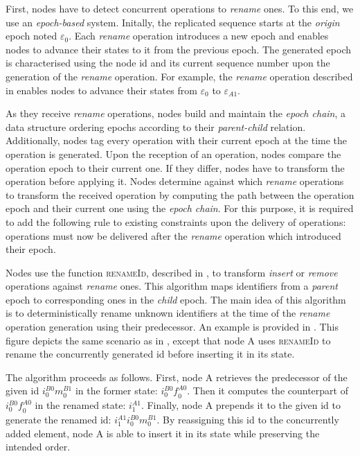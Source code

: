 \documentclass[10pt,journal,compsoc]{IEEEtran}
\newcommand{\trm}[1]{\mathit{#1}}
\newcommand{\id}[3]{$\trm{#1}^{\trm{#2}}_{\trm{#3}}$}
\newcommand{\epoch}[1]{$\varepsilon_{#1}$}
\begin{document}
First, nodes have to detect concurrent operations to \emph{rename} ones.
To this end, we use an \emph{epoch-based} system.
Initally, the replicated sequence starts at the \emph{origin} epoch noted \epoch{0}.
Each \emph{rename} operation introduces a new epoch and enables nodes to advance their states to it from the previous epoch.
The generated epoch is characterised using the node id and its current sequence number upon the generation of the \emph{rename} operation.
For example, the \emph{rename} operation described in  enables nodes to advance their states from \epoch{0} to \epoch{A1}.

As they receive \emph{rename} operations, nodes build and maintain the \emph{epoch chain}, a data structure ordering epochs according to their \emph{parent-child} relation.
Additionally, nodes tag every operation with their current epoch at the time the operation is generated.
Upon the reception of an operation, nodes compare the operation epoch to their current one.
If they differ, nodes have to transform the operation before applying it.
Nodes determine against which \emph{rename} operations to transform the received operation by computing the path between the operation epoch and their current one using the \emph{epoch chain}.
For this purpose, it is required to add the following rule to existing constraints upon the delivery of operations: operations must now be delivered after the \emph{rename} operation which introduced their epoch.

Nodes use the function \textsc{renameId}, described in , to transform \emph{insert} or \emph{remove} operations against \emph{rename} ones.
This algorithm maps identifiers from a \emph{parent} epoch to corresponding ones in the \emph{child} epoch.
The main idea of this algorithm is to deterministically rename unknown identifiers at the time of the \emph{rename} operation generation using their predecessor.
An example is provided in .
This figure depicts the same scenario as in , except that node A uses \textsc{renameId} to rename the concurrently generated id before inserting it in its state.

The algorithm proceeds as follows.
First, node A retrieves the predecessor of the given id \id{i}{B0}{0}\id{m}{B1}{0} in the former state: \id{i}{B0}{0}\id{f}{A0}{0}.
Then it computes the counterpart of \id{i}{B0}{0}\id{f}{A0}{0} in the renamed state: \id{i}{A1}{1}.
Finally, node A prepends it to the given id to generate the renamed id: \id{i}{A1}{1}\id{i}{B0}{0}\id{m}{B1}{0}.
By reassigning this id to the concurrently added element, node A is able to insert it in its state while preserving the intended order.
\end{document}
